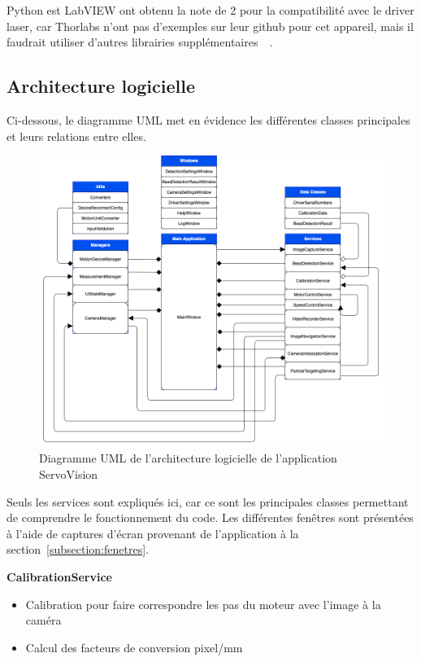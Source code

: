Python est LabVIEW ont obtenu la note de 2 pour la compatibilité avec le driver laser, car Thorlabs n'ont pas d'exemples sur leur github pour cet appareil, mais il faudrait utiliser d'autres librairies supplémentaires~\cite{controlLaserDriverPython}~\cite{controlLaserDriverLabVIEW}.

\newpage
\subsection{Architecture logicielle}
Ci-dessous, le diagramme UML met en évidence les différentes classes principales et leurs relations entre elles.
\begin{figure}[H]
    \centering
    \includegraphics[width=\textwidth]{assets/figures/Application_ServoVision/ServoVision_UML_Diagram.drawio.png}
    \caption{Diagramme UML de l'architecture logicielle de l'application ServoVision}
    \label{uml_servovision}
\end{figure}

Seuls les services sont expliqués ici, car ce sont les principales classes permettant de comprendre le fonctionnement du code. Les différentes fenêtres sont présentées à l'aide de captures d'écran provenant de l'application à la section~\ref{subsection:fenetres}.

\textbf{CalibrationService}
\begin{itemize}[label=\textbullet]
    \item Calibration pour faire correspondre les pas du moteur avec l'image à la caméra
    \item Calcul des facteurs de conversion pixel/mm
\end{itemize}

